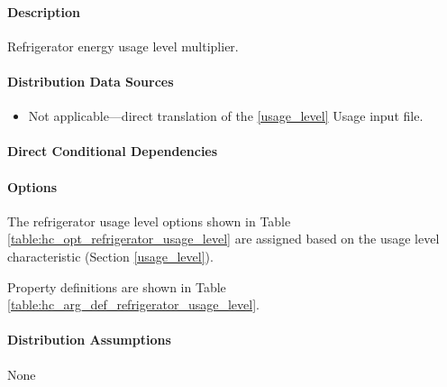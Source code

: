 \paragraph{Description}
% 
Refrigerator energy usage level multiplier.

\paragraph{Distribution Data Sources}
% 
\begin{itemize}
\item 

Not applicable---direct translation of the \ref{usage_level} Usage input file.
\end{itemize}

\paragraph{Direct Conditional Dependencies}


\paragraph{Options}
The refrigerator usage level options shown in Table \ref{table:hc_opt_refrigerator_usage_level} are assigned based on the usage level characteristic (Section \ref{usage_level}).



Property definitions are shown in Table \ref{table:hc_arg_def_refrigerator_usage_level}. %



\paragraph{Distribution Assumptions}
% 
None

